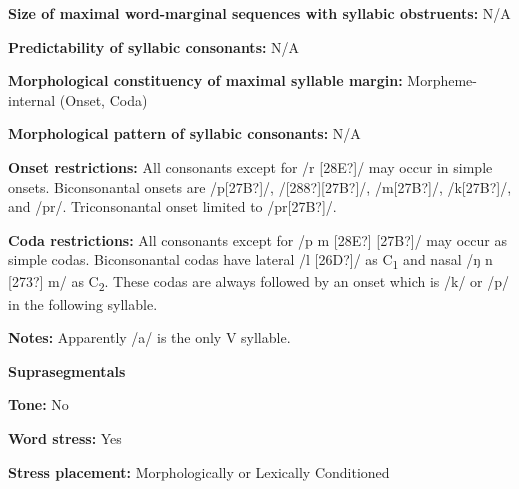 \begin{styleBody}
\textbf{Size of maximal word{}-marginal sequences with syllabic obstruents:} N/A
\end{styleBody}

\begin{styleBody}
\textbf{Predictability of syllabic consonants:} N/A
\end{styleBody}

\begin{styleBody}
\textbf{Morphological constituency of maximal syllable margin:} Morpheme-internal (Onset, Coda)
\end{styleBody}

\begin{styleBody}
\textbf{Morphological pattern of syllabic consonants:} N/A
\end{styleBody}

\begin{styleBody}
\textbf{Onset restrictions: }All consonants except for /r [28E?]/ may occur in simple onsets. Biconsonantal onsets are /p[27B?]/, /[288?][27B?]/, /m[27B?]/, /k[27B?]/, and /pr/. Triconsonantal onset limited to /pr[27B?]/.
\end{styleBody}

\begin{styleBody}
\textbf{Coda restrictions: }All consonants except for /p m [28E?] [27B?]/ may occur as simple codas. Biconsonantal codas have lateral /l [26D?]/ as C\textsubscript{1} and nasal /ŋ n [273?] m/ as C\textsubscript{2}. These codas are always followed by an onset which is /k/ or /p/ in the following syllable.
\end{styleBody}

\begin{styleBody}
\textbf{Notes: }Apparently /a/ is the only V syllable.
\end{styleBody}

\begin{styleBody}
\textbf{Suprasegmentals}
\end{styleBody}

\begin{styleBody}
\textbf{Tone:} No
\end{styleBody}

\begin{styleBody}
\textbf{Word stress:} Yes
\end{styleBody}

\begin{styleBody}
\textbf{Stress placement:} Morphologically or Lexically Conditioned
\end{styleBody}

